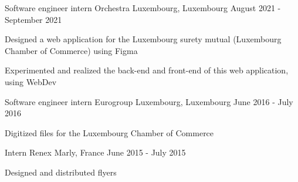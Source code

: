 
\begin{cventries}
  \cventry
    {Software engineer intern} %
    {Orchestra} %
    {Luxembourg, Luxembourg} %
    {August 2021 - September 2021} %
    {
      \begin{cvitems} %
        \item {Designed a web application for the Luxembourg surety mutual (Luxembourg Chamber of Commerce) using Figma}
        \item {Experimented and realized the back-end and front-end of this web application, using WebDev}
      \end{cvitems}
    }

  \cventry
    {Software engineer intern} %
    {Eurogroup} %
    {Luxembourg, Luxembourg} %
    {June 2016 - July 2016} %
    {
      \begin{cvitems} %
        \item {Digitized files for the Luxembourg Chamber of Commerce}
      \end{cvitems}
    }

  \cventry
    {Intern} %
    {Renex} %
    {Marly, France} %
    {June 2015 - July 2015} %
    {
      \begin{cvitems} %
        \item {Designed and distributed flyers}
      \end{cvitems}
    }

\end{cventries}
